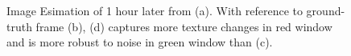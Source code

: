 \documentclass[conference]{IEEEtran}
\begin{document}
\begin{figure}[tb]
\centering
{}
\caption{Image Esimation of 1 hour later from (a). With reference to
ground-truth frame (b), (d) captures more texture changes in red
window and is more robust to noise in green window than (c).}
\label{fig:mecmp}
\end{figure}
\end{document}
